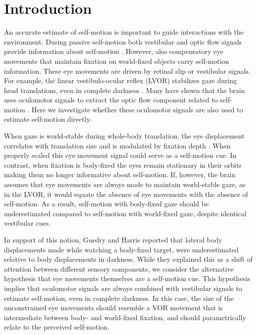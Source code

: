 \section{Introduction}

An accurate estimate of self-motion is important to guide interactions with the environment. During passive self-motion both vestibular and optic flow signals provide information about self-motion \cite{gibson1955,benson1986,harris2000,israel1989,angelaki2005,carriot2013,chen2010}. However, also compensatory eye movements that maintain fixation on world-fixed objects carry self-motion information. These eye movements are driven by retinal slip or vestibular signals. For example, the linear vestibulo-ocular reflex (LVOR) stabilizes gaze during head translations, even in complete darkness \cite{paige1989,medendorp2002,angelaki2004}.  Many have shown that the brain uses oculomotor signals to extract the optic flow component related to self-motion \cite{warren1988,royden1992,freeman1998,lappe1999}. Here we investigate whether these oculomotor signals are also used to estimate self-motion directly.

When gaze is world-stable during whole-body translation, the eye displacement correlates with translation size and is modulated by fixation depth \cite{schwarz1989,paige1998,mchenry2000,medendorp2002}. When properly scaled this eye movement signal could serve as a self-motion cue. In contrast, when fixation is body-fixed the eyes remain stationary in their orbits \cite{paige1998,ramat2005} making them no longer informative about self-motion. If, however, the brain assumes that eye movements are always made to maintain world-stable gaze, as in the LVOR, it would equate the absence of eye movements with the absence of self-motion. As a result, self-motion with body-fixed gaze should be underestimated compared to self-motion with world-fixed gaze, despite identical vestibular cues.

In support of this notion, Guedry and Harris \citeyear{guedry1963} reported that lateral body displacements made while watching a body-fixed target, were underestimated relative to body displacements in darkness. While they explained this as a shift of attention between different sensory components, we consider the alternative hypothesis that eye movements themselves are a self-motion cue. This hypothesis implies that oculomotor signals are always combined with vestibular signals to estimate self-motion, even in complete darkness.  In this case, the size of the unconstrained eye movements should resemble a VOR movement that is intermediate between body- and world-fixed fixation, and should parametrically relate to the perceived self-motion.

